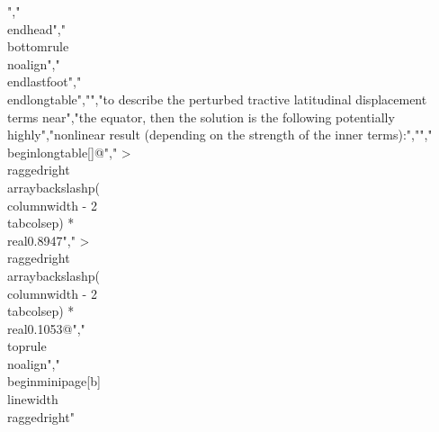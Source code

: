{{{{{{{{{{","\\endhead","\\bottomrule\\noalign{}","\\endlastfoot","\\end{longtable}","","to describe the perturbed tractive latitudinal displacement terms near","the equator, then the solution is the following potentially highly","nonlinear result (depending on the strength of the inner terms):","","\\begin{longtable}[]{@{}","  >{\\raggedright\\arraybackslash}p{(\\columnwidth - 2\\tabcolsep) * \\real{0.8947}}","  >{\\raggedright\\arraybackslash}p{(\\columnwidth - 2\\tabcolsep) * \\real{0.1053}}@{}}","\\toprule\\noalign{}","\\begin{minipage}[b]{\\linewidth}\\raggedright"}}}}}}}}}}
